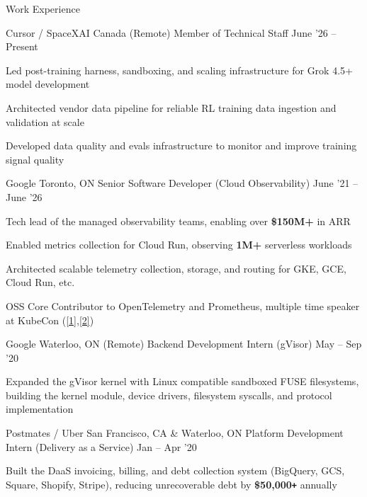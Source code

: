 \documentclass{resume} %
\begin{document}
\begin{rSection}{Work Experience}
  \begin{rWorkSection}{Cursor / SpaceXAI}
		     {Canada (Remote)}
		     {Member of Technical Staff}
		     {June '26 -- Present}
    {
      \item Led post-training harness, sandboxing, and scaling infrastructure for Grok 4.5+ model development
      \item Architected vendor data pipeline for reliable RL training data ingestion and validation at scale
      \item Developed data quality and evals infrastructure to monitor and improve training signal quality
    }
  \end{rWorkSection}
  \begin{rWorkSection}{Google}
		     {Toronto, ON}
		     {Senior Software Developer (Cloud Observability)}
		     {June '21 -- June '26}
    {
      \item Tech lead of the managed observability teams, enabling over \textbf{\$150M+} in ARR
      \item Enabled metrics collection for Cloud Run, observing \textbf{1M+} serverless workloads
      \item Architected scalable telemetry collection, storage, and routing for GKE, GCE, Cloud Run, etc.
      \item OSS Core Contributor to OpenTelemetry and Prometheus, multiple time speaker at KubeCon (\href{https://www.youtube.com/watch?v=r6qb3OivFyQ&t=1s}{[1]},\href{https://youtu.be/k_WeK-SwH-w?si=dG2SQWNUxNSAjITb}{[2]})
    }
  \end{rWorkSection}
  \begin{rWorkSection}{Google}
		     {Waterloo, ON (Remote)}
		     {Backend Development Intern (gVisor)}
		     {May -- Sep '20}
    {
      \item Expanded the gVisor kernel with Linux compatible sandboxed FUSE filesystems, building the
        kernel module, device drivers, filesystem syscalls, and protocol implementation
    }
  \end{rWorkSection}
  \begin{rWorkSection}{Postmates / Uber}
		     {San Francisco, CA \& Waterloo, ON}
		     {Platform Development Intern (Delivery as a Service)}
		     {Jan -- Apr '20}
    {
      \item Built the DaaS invoicing, billing, and debt collection system (BigQuery, GCS, Square,
        Shopify, Stripe), reducing unrecoverable debt by \textbf{\$50,000\texttt{+}} annually
}
\end{rWorkSection}
\end{rSection}
\end{document}
